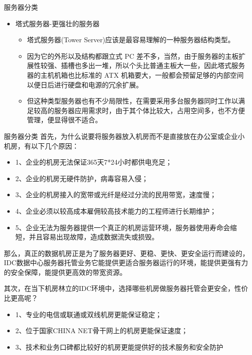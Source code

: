 \begin{ascolorbox11}{服务器分类}
\begin{itemize}
\begin{itemize}
\begin{itemize}
		不过，管理员可以使用系统软件将这些母板集合成一个服 务器集群。在集群模式下，所有的母板可以连接起来提供高速的网络环境，并同时共享资源， 为相同的用户群服务。在集群中插入新的"刀片"，就可以提高整体性能。而由于每块"刀片"都是热插拔的，所以，系统可以轻松地进行替换，并且将维护时间减少到最小。
	\end{itemize}
	\item 塔式服务器-更强壮的服务器
		\begin{itemize}
	\item 塔式服务器(Tower Server)应该是最容易理解的一种服务器结构类型。
	\item 因为它的外形以及结构都跟立式 PC 差不多，当然，由于服务器的主板扩展性较强、插槽也多出一堆，所以个头比普通主板大一些，因此塔式服务器的主机机箱也比标准的 ATX 机箱要大，一般都会预留足够的内部空间以便日后进行硬盘和电源的冗余扩展。
	\item 但这种类型服务器也有不少局限性，在需要采用多台服务器同时工作以满足较高的服务器应用需求时，由于其个体比较大，占用空间多，也不方便管理，便显得很不适合。
\end{itemize}
\end{itemize}
\end{itemize}
\end{ascolorbox11}


\begin{ascolorbox16}{服务器分类}
首先，为什么说要将服务器放入机房而不是直接放在办公室或企业小机房，有以下几个原因：
\begin{itemize}
	\item 1、企业的机房无法保证365天7*24小时都供电充足；
	
	\item 2、企业的机房无硬件防护，病毒容易入侵；
	
	\item 3、企业的机房接入的宽带或光纤是经过分流的民用带宽，速度慢；
	
	\item 4、企业必须以较高成本雇佣较高技术能力的工程师进行长期维护；
	
	\item 5、企业无法为服务器提供一个真正的机房运营环境，服务器使用寿命会缩短，并且容易出现故障，造成数据流失或损毁。
\end{itemize}
那么，真正的数据机房正是为了服务器更好、更稳、更快、更安全运行而建设的，IDC数据中心服务器托管业务它能提供更适合服务器运行的环境，能提供更强有力的安全保障，能提供更高效的带宽资源。

其次，在当下机房林立的IDC环境中，选择哪些机房做服务器托管会更安全，性价比更高呢？
\begin{itemize}
\item 	1、专业的电信或联通或双线机房更能保证稳定；	
\item 	2、位于国家CHINA NET骨干网上的机房更能保证速度；
\item 	3、技术和业务口碑都比较好的机房更能提供好的技术服务和安全防护
\end{itemize}
\end{ascolorbox16}


